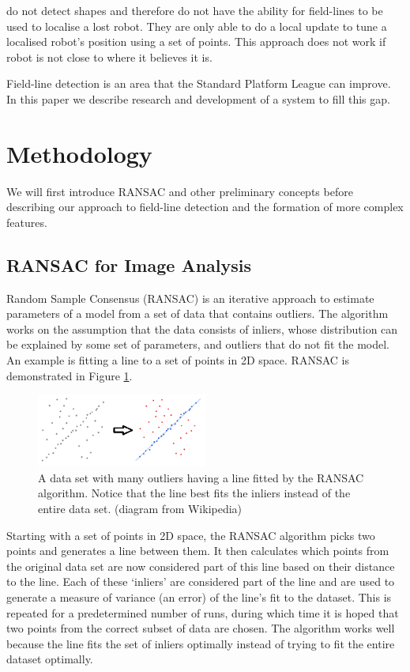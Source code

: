 \documentclass{article}
\begin{document}
\citeauthor{rUNSWift2010}  do not detect shapes and therefore do not have the ability for field-lines to be used to localise a lost robot. They are only able to do a local update to tune a localised robot's position using a set of points. This approach does not work  if robot is not close to where it believes it is. 

Field-line detection is an area that the Standard Platform League can improve. In this paper we describe research and development of a system to fill this gap.

\section{Methodology}

We will first introduce RANSAC and other preliminary concepts before describing our approach to field-line detection and the formation of more complex features. 

\subsection{RANSAC for Image Analysis}
Random Sample Consensus (RANSAC) \cite{Fischler:1981:RSC:358669.358692} is an iterative approach to estimate parameters of a model from a set of data that contains outliers. The algorithm works on the assumption that the data consists of inliers, whose distribution can be explained by some set of parameters, and outliers that do not fit the model. An example is fitting a line to a set of points in 2D space. RANSAC is demonstrated in Figure \ref{fig:ransac}.

\begin{figure}[H]
\centering
\includegraphics[width=0.5\textwidth]{Pictures/ransac.png}
\caption{A data set with many outliers having a line fitted by the RANSAC algorithm. Notice that the line best fits the inliers instead of the entire data set. (diagram from Wikipedia)}
\label{fig:ransac}
\end{figure}

Starting with a set of points in 2D space, the RANSAC algorithm picks two points and generates a line between them. It then calculates which points from the original data set are now considered part of this line based on their distance to the line. Each of these `inliers' are considered part of the line and are used to generate a measure of variance (an error) of the line's fit to the dataset. This is repeated for a predetermined number of runs, during which time it is hoped that two points from the correct subset of data are chosen. The algorithm works well because the line fits the set of inliers optimally instead of trying to fit the entire dataset optimally.
\end{document}
